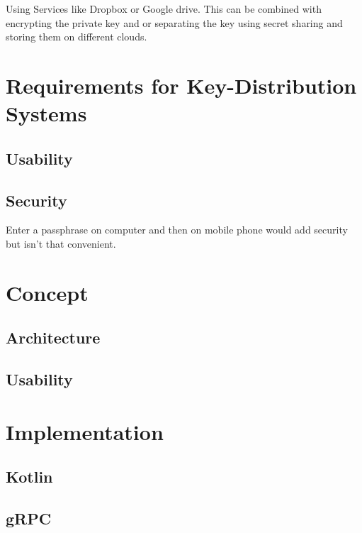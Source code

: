 \documentclass[12pt,oneside,a4paper,parskip]{scrbook}
\begin{document}
Using Services like Dropbox or Google drive. This can be combined with encrypting the private key and or separating the key using secret sharing and 
storing them on different clouds. 




\chapter{Requirements for Key-Distribution Systems}

\section{Usability}

\section{Security}

Enter a passphrase on computer and then on mobile phone would add security but isn't that convenient.

\chapter{Concept}

\section{Architecture}

\section{Usability}

\chapter{Implementation}

\section{Kotlin}

\section{gRPC}
\end{document}

